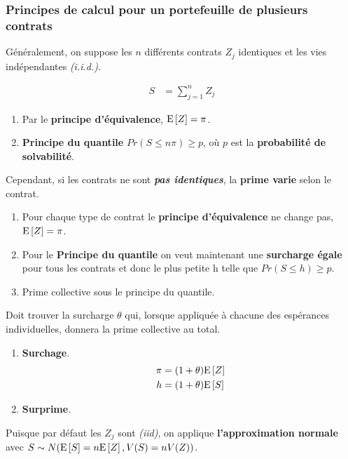 \documentclass[10pt, french]{article}
\begin{document}
\begin{multicols*}{3}
\subsubsection*{Principes de calcul pour un portefeuille de plusieurs contrats}

Généralement, on suppose les $n$ différents contrats $Z_{j}$ identiques et les vies indépendantes \textit{(i.i.d.)}.

\begin{align*}	
	S &= \sum_{j = 1}^{n} Z_j 
\end{align*}

\begin{enumerate}
	\item[1. ] Par le \textbf{principe d'équivalence}, $\mathrm{E} \left[ Z \right] = \pi$.
	\item[3. ] \textbf{Principe du quantile }$Pr(S \le n \pi) \ge p$, où $p$ est la \textbf{probabilité de solvabilité}.
\end{enumerate}

Cependant, si les contrats ne sont \textbf{\textit{pas identiques}}, la \textbf{prime varie} selon le contrat.
\begin{enumerate}[leftmargin = .75cm]
	\item[1. ] Pour chaque type de contrat le \textbf{principe d'équivalence} ne change pas, $\mathrm{E} \left[ Z \right] = \pi$.
	\item[3. ] Pour le \textbf{Principe du quantile }on veut maintenant une \textbf{surcharge égale} pour tous les contrats et donc le plus petite h telle que $Pr(S \le h) \ge p$.
	\item[$h$ : ] Prime collective sous le principe du quantile.
\end{enumerate}

Doit trouver la surcharge $\theta$ qui, lorsque appliquée à chacune des espérances individuelles, donnera la prime collective au total.

\begin{enumerate}[leftmargin = .75cm]
	\item[$\theta$ : ] \textbf{Surchage}.
\begin{align*}
		\pi &= (1 + \theta) \mathrm{E} \left[ Z \right] \\
		h &= (1 + \theta) \mathrm{E} \left[ S \right] 
\end{align*}
	\item[$\theta \text{E}\lbrack Z \rbrack$ : ] \textbf{Surprime}.
\end{enumerate}

\bigskip

Puisque par défaut les $Z_{j}$ sont \textit{(iid)}, on applique \textbf{l'approximation normale} avec $S \sim N(\mathrm{E} \left[ S \right] = n \mathrm{E} \left[ Z \right], V(S) = nV(Z))$.


\end{multicols*}
\end{document}
